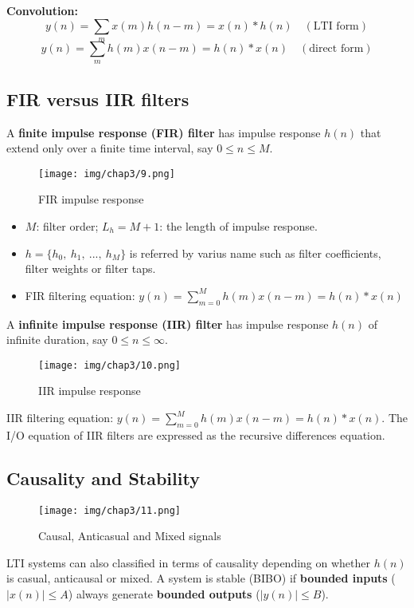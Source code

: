 \textbf{Convolution:}
\begin{equation*}
    y(n) = \sum_{m}x(m)h(n-m)=x(n)*h(n) \quad (\text{LTI form})
\end{equation*}
\begin{equation*}
    y(n) = \sum_{m}h(m)x(n-m)=h(n)*x(n) \quad (\text{direct form})
\end{equation*}
\subsection{FIR versus IIR filters}
A \textbf{finite impulse response (FIR) filter} has impulse response $h(n)$ that extend only over a finite time interval, say $0 \leq n \leq M$.
\begin{figure}[h!]
    \centering
    \texttt{[image: img/chap3/9.png]}
    \caption{FIR impulse response}
\end{figure}
\begin{itemize}
    \item $M$: filter order; $L_h=M+1$: the length of impulse response.
    \item $h=\{h_0,\ h_1,\ ...,\ h_M\}$ is referred by varius name such as filter coefficients, filter weights or filter taps.
    \item FIR filtering equation: $y(n) = \displaystyle\sum_{m=0}^{M}h(m)x(n-m)=h(n)*x(n) $
\end{itemize}
A \textbf{infinite impulse response (IIR) filter} has impulse response $h(n)$ of infinite duration, say $0\leq n \leq\infty$.
\begin{figure}[h!]
    \centering
    \texttt{[image: img/chap3/10.png]}
    \caption{IIR impulse response}
\end{figure}

IIR filtering equation: $y(n) = \displaystyle\sum_{m=0}^{M}h(m)x(n-m)=h(n)*x(n) $. The I/O equation of IIR filters are expressed as the recursive differences equation.
\subsection{Causality and Stability}
\begin{figure}[h!]
    \centering
    \texttt{[image: img/chap3/11.png]}
    \caption{Causal, Anticasual and Mixed signals}
\end{figure}

LTI systems can also classified in terms of causality depending on whether $h(n)$ is casual, anticausal or mixed. A system is stable (BIBO) if \textbf{bounded inputs} ($|x(n)| \leq A$) always generate \textbf{bounded outputs} ($|y(n)| \leq B$).

